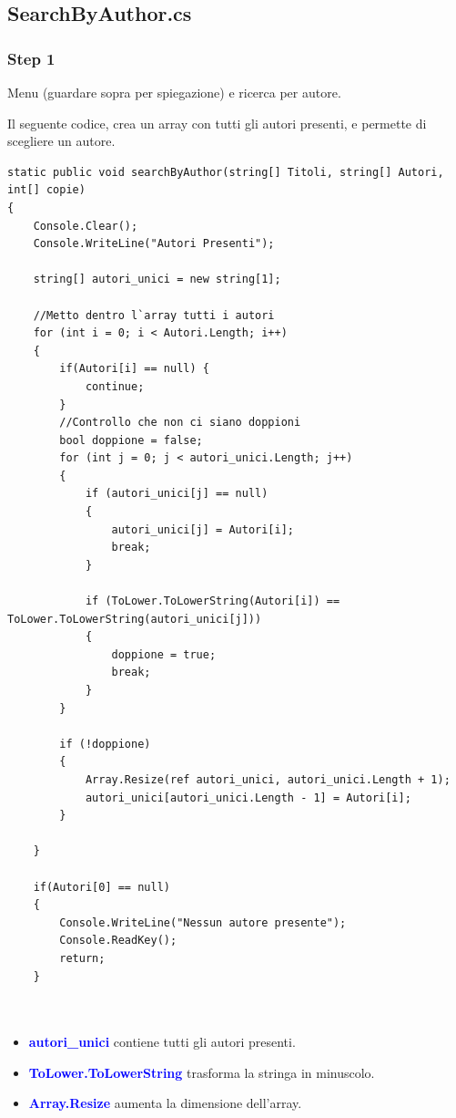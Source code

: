 \documentclass[a4paper,12pt]{article}
\begin{document}
\newpage

\subsection{SearchByAuthor.cs}
\subsubsection{Step 1}
Menu (guardare sopra per spiegazione) e ricerca per autore.

Il seguente codice, crea un array con tutti gli autori presenti, e permette di scegliere un autore.

\begin{lstlisting}
static public void searchByAuthor(string[] Titoli, string[] Autori, int[] copie)
{
    Console.Clear();
    Console.WriteLine("Autori Presenti");

    string[] autori_unici = new string[1];

    //Metto dentro l`array tutti i autori 
    for (int i = 0; i < Autori.Length; i++)
    {
        if(Autori[i] == null) {
            continue;
        }
        //Controllo che non ci siano doppioni
        bool doppione = false;
        for (int j = 0; j < autori_unici.Length; j++)
        {
            if (autori_unici[j] == null)
            {
                autori_unici[j] = Autori[i];
                break;
            }
                    
            if (ToLower.ToLowerString(Autori[i]) == ToLower.ToLowerString(autori_unici[j]))
            {
                doppione = true;
                break;
            }
        }

        if (!doppione)
        {
            Array.Resize(ref autori_unici, autori_unici.Length + 1);
            autori_unici[autori_unici.Length - 1] = Autori[i];
        }

    }

    if(Autori[0] == null)
    {
        Console.WriteLine("Nessun autore presente");
        Console.ReadKey();
        return;
    }

    
\end{lstlisting}

\begin{itemize}
    \item \textcolor{blue}{\textbf{autori\_unici}} contiene tutti gli autori presenti.
    \item \textcolor{blue}{\textbf{ToLower.ToLowerString}} trasforma la stringa in minuscolo.
    \item \textcolor{blue}{\textbf{Array.Resize}} aumenta la dimensione dell'array.
\end{itemize}
\end{document}

